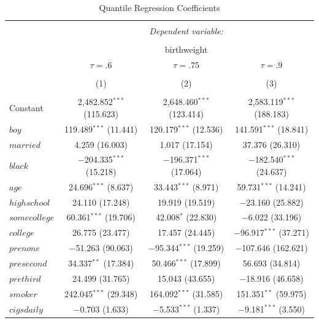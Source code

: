 \documentclass[12pt]{paper}
\begin{document}
\begin{table}[H] \centering 
  \caption{Quantile Regression Coefficients} 
  \label{} 
\small 
\begin{tabular}{@{\extracolsep{1pt}}lccc} 
\\[-1.8ex]\hline 
\hline \\[-1.8ex] 
 & \multicolumn{3}{c}{\textit{Dependent variable:}} \\ 
\cline{2-4} 
\\[-1.8ex] & \multicolumn{3}{c}{birthweight} \\ 
 & $\tau = .6$ & $\tau = .75$ & $\tau = .9$ \\ 
\\[-1.8ex] & (1) & (2) & (3)\\ 
\hline \\[-1.8ex] 
 Constant & 2,482.852$^{***}$ (115.623) & 2,648.460$^{***}$ (123.414) & 2,583.119$^{***}$ (188.183) \\ 
  $boy$ & 119.489$^{***}$ (11.441) & 120.179$^{***}$ (12.536) & 141.591$^{***}$ (18.841) \\ 
  $married$ & 4.259 (16.003) & 1.017 (17.154) & 37.376 (26.310) \\ 
  $black$ & $-$204.335$^{***}$ (15.218) & $-$196.371$^{***}$ (17.064) & $-$182.540$^{***}$ (24.637) \\ 
  $age$ & 24.696$^{***}$ (8.637) & 33.443$^{***}$ (8.971) & 59.731$^{***}$ (14.241) \\ 
  $highschool$ & 24.110 (17.248) & 19.919 (19.519) & $-$23.160 (25.882) \\ 
  $somecollege$ & 60.361$^{***}$ (19.706) & 42.008$^{*}$ (22.830) & $-$6.022 (33.196) \\ 
  $college$ & 26.775 (23.477) & 17.457 (24.445) & $-$96.917$^{***}$ (37.271) \\ 
  $prenone$ & $-$51.263 (90.063) & $-$95.344$^{***}$ (19.259) & $-$107.646 (162.621) \\ 
  $presecond$ & 34.337$^{**}$ (17.384) & 50.466$^{***}$ (17.899) & 56.693 (34.814) \\ 
  $prethird$ & 24.499 (31.765) & 15.043 (43.655) & $-$18.916 (46.658) \\ 
  $smoker$ & 242.045$^{***}$ (29.348) & 164.092$^{***}$ (31.585) & 151.351$^{**}$ (59.975) \\ 
  $cigsdaily$ & $-$0.703 (1.633) & $-$5.533$^{***}$ (1.337) & $-$9.181$^{***}$ (3.550) \\ 

\end{tabular}
\end{table}
\end{document}
